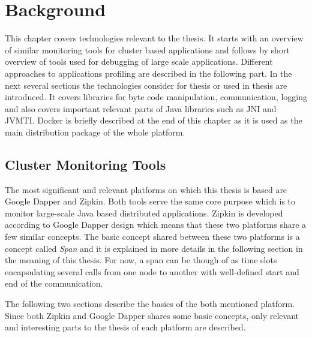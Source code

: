 \chapter{Background}
\label{chap:background}
This chapter covers technologies relevant to the thesis. It starts with an overview of similar monitoring tools for cluster based applications and follows by short overview of tools used for debugging of large scale applications. Different approaches to applications profiling are described in the following part. 
In the next several sections the technologies consider for thesis or used in thesis are introduced. It covers libraries for byte code manipulation, communication, logging and  also covers important relevant parts of Java libraries such as JNI and JVMTI. Docker is briefly described at the end of this chapter as it is used as the main distribution package of the whole platform.

\section{Cluster Monitoring Tools}
The most significant and relevant platforms on which this thesis is based are Google Dapper and Zipkin. Both tools serve the same core purpose which is to monitor large-scale Java based distributed applications. Zipkin is developed according to Google Dapper design which means that these two platforms share a few similar concepts. The basic concept shared between these two platforms is a concept called \textit{Span} and it is explained in more details in the following section in the meaning of this thesis. For now, a span can be though of as time slots encapsulating several calls from one node to another with well-defined start and end of the communication.

The following two sections describe the basics of the both mentioned platform. Since both Zipkin and Google Dapper shares some basic concepts, only relevant and interesting parts to the thesis of each platform are described.
